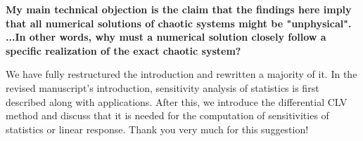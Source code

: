 \documentclass[11pt]{article}
\newcommand{\reviewerTwo}[1]{{\color{azure}\textbf{#1}}}
\begin{document}
\reviewerTwo{My main technical objection is the claim that the findings here imply that all numerical solutions of chaotic systems might be "unphysical". ...In other words, why must a numerical solution closely follow a specific realization of the exact chaotic system? }

We have fully restructured the introduction and rewritten a majority of it. In the revised manuscript's introduction, sensitivity analysis of statistics is first described along with applications. After this, we introduce the differential CLV method and discuss that it is needed for the computation of sensitivities of statistics or linear response. Thank you very much for this suggestion!
\end{document}
